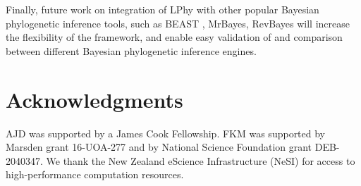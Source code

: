 \documentclass[10pt,letterpaper,table]{article}
\begin{document}
Finally, future work on integration of LPhy with other popular Bayesian phylogenetic inference tools, such as BEAST \cite{suchard2018bayesian}, MrBayes\cite{ronquist2012mrbayes}, RevBayes\cite{hohna2016revbayes} will increase the flexibility of the framework, and enable easy validation of and comparison between different Bayesian phylogenetic inference engines.

\section*{Acknowledgments}
AJD was supported by a James Cook Fellowship. FKM was supported by Marsden grant 16-UOA-277 and by National Science Foundation grant DEB-2040347. We thank the New Zealand eScience Infrastructure (NeSI) for access to high-performance computation resources.

\nolinenumbers

%
%
% 

\end{document}
